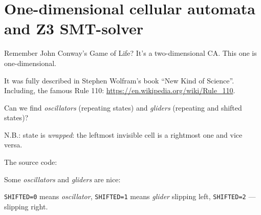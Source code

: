 \section{One-dimensional cellular automata and Z3 SMT-solver}

Remember John Conway's Game of Life? It's a two-dimensional CA.
This one is one-dimensional.

It was fully described in Stephen Wolfram's book ``New Kind of Science''.
Including, the famous Rule 110: \url{https://en.wikipedia.org/wiki/Rule_110}.

Can we find \emph{oscillators} (repeating states) and \emph{gliders} (repeating and shifted states)?

N.B.: state is \emph{wrapped}: the leftmost invisible cell is a rightmost one and vice versa.

The source code: 



Some \emph{oscillators} and \emph{gliders} are nice: 



\verb|SHIFTED=0| means \emph{oscillator}, \verb|SHIFTED=1| means \emph{glider} slipping left,
\verb|SHIFTED=2| --- slipping right.

